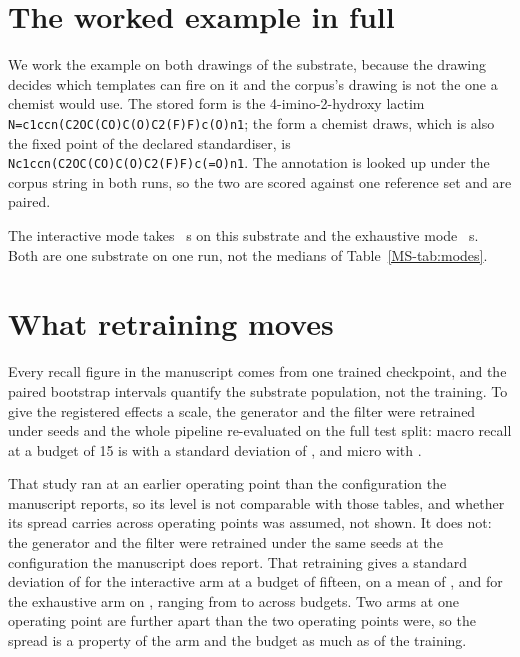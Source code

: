 \documentclass[journal=jcisd8,manuscript=suppinfo,layout=onecolumn]{achemso}
\begin{document}
\section{The worked example in full}
\label{sec:si-case}

We work the example on both drawings of the substrate, because the drawing decides which
templates can fire on it and the corpus's drawing is not the one a chemist would use. The stored
form is the 4-imino-2-hydroxy lactim
\texttt{N=c1ccn(C2OC(CO)C(O)C2(F)F)c(O)n1}; the form a chemist draws, which is also the fixed
point of the declared standardiser, is \texttt{Nc1ccn(C2OC(CO)C(O)C2(F)F)c(=O)n1}. The
annotation is looked up under the corpus string in both runs, so the two are scored against one
reference set and are paired.

The interactive mode takes \numCaseInterSeconds~s on this substrate and the exhaustive mode
\numCaseExhSeconds~s. Both are one substrate on one run, not the medians of
Table~\ref{MS-tab:modes}.



\section{What retraining moves}
\label{sec:si-retrain}

Every recall figure in the manuscript comes from one trained checkpoint, and the paired bootstrap
intervals quantify the substrate population, not the training. To give the registered
effects a scale, the generator and the filter were retrained under \numSeedN{} seeds and the
whole pipeline re-evaluated on the full test split: macro recall at a budget of 15 is
\numSeedMacroMean{} with a standard deviation of \numSeedMacroStd{}, and micro
\numSeedMicroMean{} with \numSeedMicroStd{}.

That study ran at an earlier operating point than the configuration the manuscript reports, so
its level is not comparable with those tables, and whether its spread carries across operating
points was assumed, not shown. It does not: the generator and the filter were retrained under the
same \numSpreadSeeds{} seeds at the configuration the manuscript does report. That retraining gives
a standard deviation of \numSpreadInteractiveSd{} for the interactive arm at a budget of fifteen,
on a mean of \numSpreadInteractiveMean{}, and \numSpreadExhaustiveSd{} for the exhaustive arm on
\numSpreadExhaustiveMean{}, ranging from \numSpreadInteractiveSdmin{} to
\numSpreadExhaustiveSdmax{} across budgets. Two arms at one operating point are further apart than
the two operating points were, so the spread is a property of the arm and the budget as much as of
the training.
\end{document}
